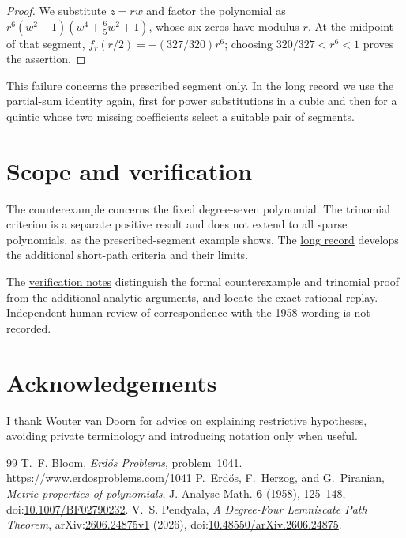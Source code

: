 \documentclass[11pt]{article}
\newcommand{\recordlink}[3]{\href{#1\##2}{#3}}
\begin{document}
\begin{proof}
We substitute $z=rw$ and factor the polynomial as
$r^6(w^2-1)(w^4+\tfrac65w^2+1)$, whose six zeros have modulus $r$.
At the midpoint of that segment, $f_r(r/2)=-(327/320)r^6$;
choosing $320/327<r^6<1$ proves the assertion.
\end{proof}

This failure concerns the prescribed segment only. In
the long record we use the partial-sum identity again,
first for power substitutions in a cubic and then for a quintic whose
two missing coefficients select a suitable pair of segments.

\section*{Scope and verification}
The counterexample concerns the fixed degree-seven polynomial. The trinomial
criterion is a separate positive result and does not extend to all sparse
polynomials, as the prescribed-segment example shows. The
\recordlink{erdos1041-lemniscate-reasoning-surface.pdf}{scope-further-estimates}
{long record} develops the additional short-path criteria and their limits.

\evidenceparagraph{\evidencerecordurl}
The \recordlink{erdos1041-lemniscate-reasoning-surface.pdf}{verification-notes}
{verification notes} distinguish the formal counterexample and trinomial
proof from the additional analytic arguments, and locate the exact rational
replay. Independent human review of correspondence with the 1958 wording
is not recorded.

\section*{Acknowledgements}
I thank Wouter van Doorn for advice on explaining restrictive hypotheses,
avoiding private terminology and introducing notation only when useful.


\begin{thebibliography}{99}
 T.~F. Bloom, \emph{Erd\H{o}s Problems}, problem~1041.
  \url{https://www.erdosproblems.com/1041}
 P.~Erd\H{o}s, F.~Herzog, and G.~Piranian,
  \emph{Metric properties of polynomials}, J. Analyse Math. \textbf{6}
  (1958), 125--148,
  doi:\href{https://doi.org/10.1007/BF02790232}{10.1007/BF02790232}.
 V.~S. Pendyala,
  \emph{A Degree-Four Lemniscate Path Theorem},
  arXiv:\href{https://arxiv.org/abs/2606.24875v1}{2606.24875v1} (2026),
  doi:\href{https://doi.org/10.48550/arXiv.2606.24875}
  {10.48550/arXiv.2606.24875}.
\end{thebibliography}
\end{document}
